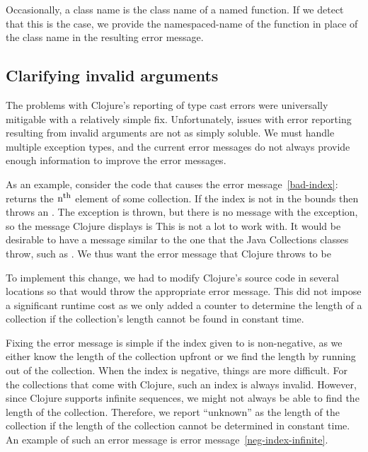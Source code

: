 \documentclass[12pt]{article}
\begin{document}
Occasionally, a class name is the class name of a named function. If we detect
that this is the case, we provide the namespaced-name of the function in place
of the class name in the resulting error message.

\subsection{Clarifying invalid arguments}\label{subsec:invalid-args}
The problems with Clojure's reporting of type cast errors were universally mitigable with a relatively simple fix. Unfortunately, issues with error reporting resulting from invalid arguments are not as simply soluble. We must handle multiple exception types, and the
current error messages do not always provide enough information to improve the
error messages.

As an example, consider the code that causes the error message~\ref{bad-index}:
 returns the $\mbox{n}^{\mbox{\footnotesize{th}}}$ element of some collection. If the
index is not in the bounds then  throws an
\ioobe.
The exception is thrown, but there
is no message with the exception, so the message Clojure displays is
\codeblock{\ioobe}
This is not a lot to work with. It would be desirable to have a message
similar to the one that the Java Collections classes throw, such as
. We thus want the error message that Clojure throws to be

To implement this change, we had to modify Clojure's source code in several
locations so that  would throw the appropriate error message. This did
not impose a significant runtime cost as we only added 
a counter to determine the
length of a collection if the collection's length cannot be found in constant
time.

Fixing the error message is simple if the index given to  is
non-negative, as we either know the length of the collection upfront or we find
the length by running out of the collection. When the index is negative, things
are more difficult. For the collections that come with Clojure, such an index is
always invalid. However, since Clojure supports infinite sequences, we might not
always be able to find the length of the collection. Therefore, we report
``unknown'' as the length of the collection if the length of the collection
cannot be determined in constant time. An example of such an error message is
error message~\ref{neg-index-infinite}.
\end{document}
